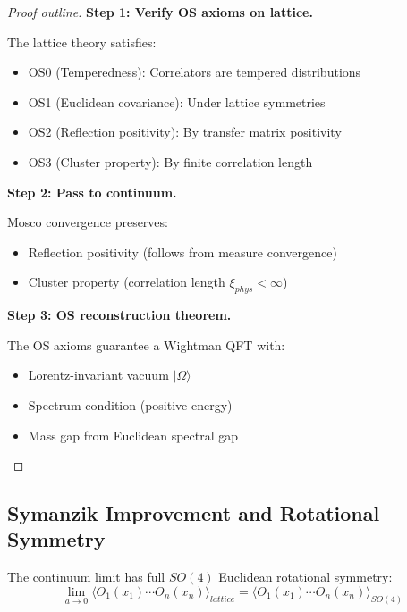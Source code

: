\begin{proof}[Proof outline]
\textbf{Step 1: Verify OS axioms on lattice.}

The lattice theory satisfies:
\begin{itemize}
\item OS0 (Temperedness): Correlators are tempered distributions
\item OS1 (Euclidean covariance): Under lattice symmetries
\item OS2 (Reflection positivity): By transfer matrix positivity
\item OS3 (Cluster property): By finite correlation length
\end{itemize}

\textbf{Step 2: Pass to continuum.}

Mosco convergence preserves:
\begin{itemize}
\item Reflection positivity (follows from measure convergence)
\item Cluster property (correlation length $\xi_{phys} < \infty$)
\end{itemize}

\textbf{Step 3: OS reconstruction theorem.}

The OS axioms guarantee a Wightman QFT with:
\begin{itemize}
\item Lorentz-invariant vacuum $|\Omega\rangle$
\item Spectrum condition (positive energy)
\item Mass gap from Euclidean spectral gap
\end{itemize}
\end{proof}

\subsection{Symanzik Improvement and Rotational Symmetry}

\begin{theorem}
\label{thm:rotation-recovery}
The continuum limit has full $SO(4)$ Euclidean rotational symmetry:
\begin{equation}
\lim_{a \to 0} \langle O_1(x_1) \cdots O_n(x_n) \rangle_{lattice} = \langle O_1(x_1) \cdots O_n(x_n) \rangle_{SO(4)}
\end{equation}
\end{theorem}

